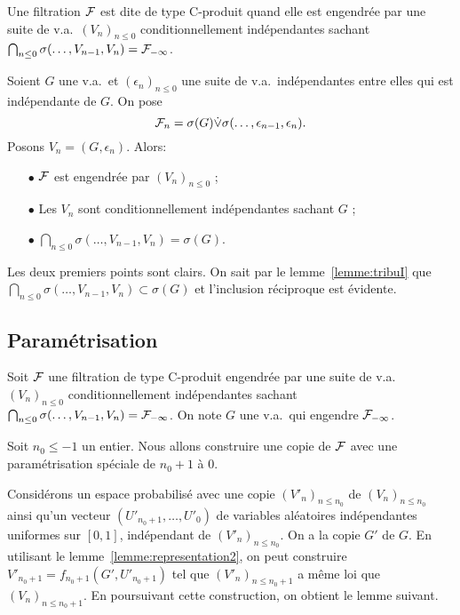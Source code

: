 \documentclass[12pt,a4paper]{article}
\begin{document}
\begin{definition}
Une filtration $\mathcal{F}$ est dite de type C-produit quand elle est engendrée par 
une suite de v.a.\ ${(V_n)}_{n \leq 0}$  conditionnellement indépendantes 
sachant $\bigcap_{n \leq 0}\sigma(\ldots, V_{n-1}, V_n) = \mathcal{F}_{-\infty}$.
\end{definition}

\begin{exemple}
Soient $G$ une v.a.\ et  ${(\epsilon_n)}_{n \leq 0}$ une suite de v.a.\ indépendantes 
entre elles qui est indépendante de $G$. On pose 
$$
\mathcal{F}_n = \sigma(G) \dot{\vee} \sigma(\ldots, \epsilon_{n-1}, \epsilon_n).
$$
Posons $V_n = (G, \epsilon_n)$. 
Alors: 
\begin{itemize}
\item[$\bullet$]  $\mathcal{F}$ est engendrée par  ${(V_n)}_{n \leq 0}$ ; 

\item[$\bullet$] Les $V_n$ sont conditionnellement indépendantes sachant $G$ ;

\item[$\bullet$]  $\bigcap_{n \leq 0}\sigma(\ldots, V_{n-1}, V_n) = \sigma(G)$.
\end{itemize}
Les deux premiers points sont clairs. 
On sait par le lemme~\ref{lemme:tribuI} que 
$\bigcap_{n \leq 0}\sigma(\ldots, V_{n-1}, V_n) \subset \sigma(G)$ et l'inclusion 
réciproque est évidente.
\end{exemple}




\subsection{Paramétrisation}

Soit $\mathcal{F}$ une filtration de type C-produit engendrée par 
une suite de v.a.\ ${(V_n)}_{n \leq 0}$ conditionnellement indépendantes 
sachant $\bigcap_{n \leq 0}\sigma(\ldots, V_{n-1}, V_n) = \mathcal{F}_{-\infty}$. 
On note $G$ une v.a.\ qui engendre $\mathcal{F}_{-\infty}$.

Soit $n_0 \leq -1$ un entier. Nous allons construire une copie de 
$\mathcal{F}$ avec une paramétrisation spéciale de $n_0+1$ à $0$. 

Considérons un espace probabilisé avec une copie ${(V'_n)}_{n \leq n_0}$ 
de ${(V_n)}_{n \leq n_0}$ ainsi qu'un vecteur $(U'_{n_0+1}, \ldots, U'_0)$ 
de variables aléatoires indépendantes uniformes sur $[0,1]$, indépendant 
de ${(V'_n)}_{n \leq n_0}$. 
On a la copie $G'$ de $G$. 
En utilisant le lemme~\ref{lemme:representation2}, on peut construire 
$V'_{n_0+1} = f_{n_0+1}(G', U'_{n_0+1})$ tel que 
${(V'_n)}_{n \leq n_0+1}$ a même loi que ${(V_n)}_{n \leq n_0+1}$. 
En poursuivant cette construction, on obtient le lemme suivant. 
\end{document}
